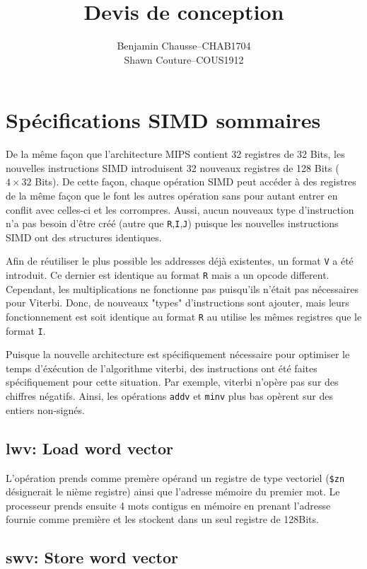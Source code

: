 \documentclass[a11paper]{article}
\title{Devis de conception}
\author{
  \addtolength{\tabcolsep}{-0.4em}
  \begin{tabular}{rcl} %
      Benjamin Chausse & -- & CHAB1704 \\
      Shawn Couture    & -- & COUS1912 \\
  \end{tabular}
}
\begin{document}
\maketitle
\newpage
\tableofcontents
\newpage

\section{Spécifications SIMD sommaires}

De la même façon que l'architecture MIPS contient 32 registres de 32 Bits, les
nouvelles instructions SIMD introduisent 32 nouveaux registres de 128 Bits
($4\times32$ Bits). De cette façon, chaque opération SIMD peut accéder à des
registres de la même façon que le font les autres opération sans pour autant
entrer en conflit avec celles-ci et les corrompres. Aussi, aucun nouveaux type
d'instruction n'a pas besoin d'être créé (autre que \verb|R|,\verb|I|,\verb|J|)
puisque les nouvelles instructions SIMD ont des structures identiques.

Afin de réutiliser le plus possible les addresses déjà existentes, un format
\verb|V| a été introduit. Ce dernier est identique au format \verb|R| mais a un
opcode different. Cependant, les multiplications ne fonctionne pas puisqu'ils
n'était pas nécessaires pour Viterbi. Donc, de nouveaux "types" d'instructions
sont ajouter, mais leurs fonctionnement est soit identique au format \verb|R|
au utilise les mêmes registres que le format \verb|I|.

Puisque la nouvelle architecture est spécifiquement nécessaire pour optimiser
le temps d'éxécution de l'algorithme viterbi, des instructions ont été faites
spécifiquement pour cette situation. Par exemple, viterbi n'opère pas sur des
chiffres négatifs. Ainsi, les opérations \verb|addv| et \verb|minv| plus bas
opèrent sur des entiers non-signés.

\subsection{lwv: Load word vector}

L'opération prends comme premère opérand un registre de type vectoriel
(\verb|$zn| désignerait le nième registre) ainsi que l'adresse mémoire du
premier mot. Le processeur prends ensuite 4 mots contigus en mémoire en prenant
l'adresse fournie comme première et les stockent dans un seul registre de
128Bits.

\subsection{swv: Store word vector}
\end{document}
